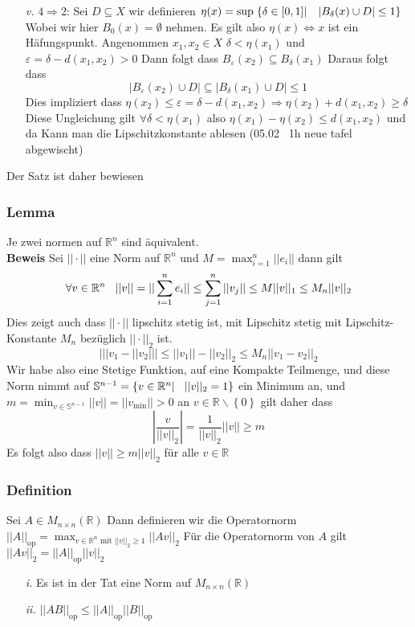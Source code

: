 \documentclass{article}
\newcommand{\smspc}{\hspace{0.3cm}}
\newcommand{\beweis}{\\\textbf{Beweis }}
\newcommand{\lemma}[1]{\subsubsection*{Lemma {#1}}}
\newcommand{\definition}[1]{\subsubsection*{Definition {#1}}}
\begin{document}
\begin{itemize}
{    Widerspricht doch dass $M$ unser supremum ist, daher gilt die behauptung, und $f$ nimmt dass maximum an. Für den minimum Kann man $-f$ betrachten.}
  \item[\textit{v.}]{$4 \Rightarrow 2$: Sei $D \subseteq X$ wir definieren $\eta(x)=\sup \left.\left\lbrace\delta\in [0,1]\right|\smspc|B_\delta (x)\cup D|\le 1 \right\rbrace$ Wobei wir hier $B_0(x)=\emptyset$ nehmen. Es gilt also
    $\eta(x)\Leftrightarrow x$ ist ein Häfungspunkt. Angenommen $x_1, x_2\in X$ $\delta<\eta(x_1)$ und $\varepsilon=\delta-d(x_1,x_2)>0$ Dann folgt dass $B_{\varepsilon}(x_2)\subseteq B_{\delta}(x_1)$ Daraus folgt dass
    \[|B_{\varepsilon}(x_2)\cup D|\subseteq |B_{\delta}(x_1)\cup D| \le 1\]Dies impliziert dass $\eta(x_2)\le \varepsilon=\delta-d(x_1,x_2) \Longrightarrow \eta(x_2)+d(x_1,x_2)\ge \delta$ Diese Ungleichung gilt $\forall \delta<\eta(x_1)$ also $\eta(x_1)-\eta(x_2)\le d(x_1,x_2)$ und da Kann man 
    die Lipschitzkonstante ablesen (05.02 ~1h neue tafel abgewischt)}
\end{itemize}
Der Satz ist daher bewiesen 
\lemma{} Je zwei normen auf $\mathbb{R}^n$ sind äquivalent.
\beweis Sei $||\cdot||$ eine Norm auf $\mathbb{R}^n$ und $M=\max_{i=1}^n||e_i||$ dann gilt \[\forall v\in \mathbb{R}^n\smspc||v||=||\sum_{i=1}^ne_i||\le \sum_{j=1}^n ||v_j||\le M||v||_1\le M_n||v||_2\] Dies zeigt auch dass $||\cdot||$ lipschitz stetig ist, mit Lipschitz stetig mit Lipschitz-Konstante $M_n$ bezüglich $||\cdot||_2$ ist. \[\left|||v_1-||v_2||\right|\le||v_1||-||v_2||_2 \le M_n||v_1-v_2||_2\]
Wir habe also eine Stetige Funktion, auf eine Kompakte Teilmenge, und diese Norm nimmt auf $\mathbb{S }^{n-1}=\left\lbrace v\in \mathbb{R}^n| \smspc ||v||_2=1\right\rbrace$ ein Minimum an, und $m=\min_{v\in \mathbb{S }^{n-1}}||v||=||v_{\text{min}}||>0$ an $v\in \mathbb{R}\backslash \left\lbrace0\right\rbrace$ gilt daher dass \[\left|\frac{v}{||v||_2}\right|=\frac{1}{||v||_2}||v||\ge m\] Es folgt also dass $||v||\ge m||v||_2$ für alle $v \in \mathbb{R}$
\definition{} Sei $A\in M_{n\times n}(\mathbb{R})$ Dann definieren wir die Operatornorm $||A||_{\text{op}}=\max_{v\in \mathbb{R}^n\text{ mit } ||v||_2\ge 1}||Av||_2$ Für die Operatornorm von $A$ gilt $||Av||_2=||A||_{\text{op}}||v||_2$
\begin{itemize}
  \item[\textit{i.}]{Es ist in der Tat eine Norm auf $M_{n\times n}(\mathbb{R})$}
  \item[\textit{ii.}]{$||AB||_{\text{op}}\le ||A||_{\text{op}}||B||_{\text{op}}$ }
\end{itemize}
\end{document}

